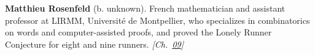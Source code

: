\textbf{Matthieu Rosenfeld} (b. unknown). French mathematician and assistant professor at LIRMM, Universit\'{e} de Montpellier, who specializes in combinatorics on words and computer-assisted proofs, and proved the Lonely Runner Conjecture for eight and nine runners. \emph{[Ch.~\hyperref[ch:arrowtheoremtopology]{09}]}

